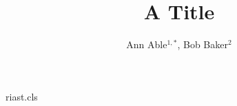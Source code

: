 \begin{filecontents*}[overwrite]{riast.cls}
\renewcommand{\author}[1]{{\raggedright #1\par}}
\newcommand{\affil}[1]{{\small\raggedright #1}}
\end{filecontents*}
\documentclass{riast}

\title{A Title}
\author{Ann Able$^{1,\ast}$, Bob Baker$^{2}$}




\maketitle
Text.

